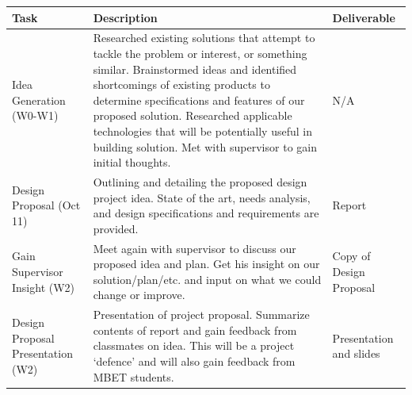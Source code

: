 \documentclass{report}
\begin{document}
\begin{longtable}[htbp] {| P{2.5cm} | P{10cm} | P{2.5cm} |}
    \hline
    Task                                       & Description                                                                                                                                                                                                                                                                                                                                                                                & Deliverable                                        \\ \hline
    Idea Generation (W0-W1)                    & Researched existing solutions that attempt to tackle the problem or interest, or something similar. Brainstormed ideas and identified shortcomings of existing products to determine specifications and features of our proposed solution. Researched applicable technologies that will be potentially useful in building solution. Met with supervisor to gain initial thoughts. & N/A                                                \\ \hline
    Design Proposal (Oct 11)                   & Outlining and detailing the proposed design project idea. State of the art, needs analysis, and design specifications and requirements are provided.                                                                                                                                                                                                                                       & Report                                             \\ \hline
    Gain Supervisor Insight (W2)               & Meet again with supervisor to discuss our proposed idea and plan. Get his insight on our solution/plan/etc. and input on what we could change or improve.                                                                                                                                                                                                                                  & Copy of Design Proposal                            \\ \hline
    Design Proposal Presentation (W2)          & Presentation of project proposal. Summarize contents of report and gain feedback from classmates on idea. This will be a project `defence' and will also gain feedback from MBET students.                                                                                                                                                                                                 & Presentation and slides                            \\ \hline

\end{longtable}
\end{document}
